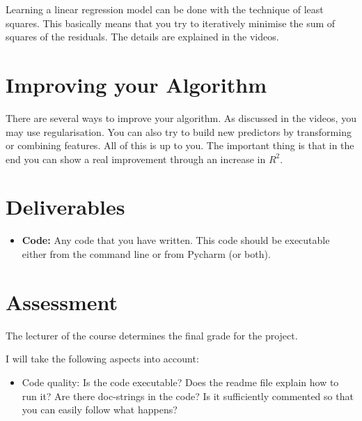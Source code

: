 \documentclass[11pt, leqno, a4paper]{article}
\begin{document}
Learning a linear regression model can be done with the technique of least squares. This basically
means that you try to iteratively minimise the sum of squares of the residuals. The details are
explained in the videos.

\section{Improving your Algorithm}

There are several ways to improve your algorithm. As discussed in the videos, you may use regularisation.
You can also try to build new predictors by transforming or combining features. All of this
is up to you. The important thing is that in the end you can show a real improvement through an
increase in $ R^{2} $.

\section{Deliverables}
\begin{itemize}
\item \textbf{Code:} Any code that you have written. This code should be executable either from the command line or from Pycharm (or both).
\end{itemize}

\section{Assessment}
The lecturer of the course determines the final grade for the project.

I will take the following aspects into account:
\begin{itemize}
\item Code quality: Is the code executable? Does the readme file
  explain how to run it? Are there doc-strings in the code? Is it
  sufficiently commented so that you can easily follow what happens?
\end{itemize}
\end{document}
